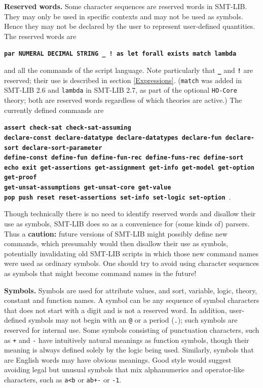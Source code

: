 \documentclass[12pt,oneside]{report}
\begin{document}
{\bf Reserved words.} Some character sequences are reserved words in SMT-LIB.  They may only be used in specific contexts and 
may not be used as symbols.  Hence they may not be declared by the user to represent user-defined quantities. The reserved
words are \\
\centerline{\bf \tt par NUMERAL DECIMAL STRING \_ ! as let forall exists match lambda}
and all the commands of the script language.  Note particularly that {\bf \tt \_} and {\bf \tt !} are
reserved; their use is described in section \ref{Expressions}.  ({\tt match} was added in SMT-LIB 2.6 and {\tt lambda} in SMT-LIB 2.7, as part of the optional {\tt HO-Core} theory; both are reserved words regardless of which theories are active.)
The currently defined commands are
\begin{center}{\bf \tt assert check-sat check-sat-assuming \\
declare-const declare-datatype declare-datatypes declare-fun declare-sort declare-sort-parameter \\
define-const define-fun define-fun-rec define-funs-rec define-sort \\
echo exit get-assertions get-assignment get-info get-model get-option get-proof \\
get-unsat-assumptions get-unsat-core get-value \\
pop push reset reset-assertions set-info set-logic set-option }.\end{center}
  Though technically there is no need to identify
reserved words and disallow their use as symbols, SMT-LIB does so as a convenience for (some kinds of) parsers. Thus a {\bf caution:} future
versions of SMT-LIB might possibly define new commands, which presumably would then disallow their use as symbols, potentially invalidating old
SMT-LIB scripts in which those new command names were used as ordinary symbols.  One should try to avoid using character sequences as symbols that might become command names in the future!

{\bf Symbols.}  Symbols are used for attribute values, and sort, variable, logic, theory, constant and function names. A symbol can be any sequence of symbol characters that does not
start with a digit and is not a reserved word. In addition, user-defined symbols may not begin with an {\tt @} or a period ({\tt .}); such
symbols are reserved for internal use. Some symbols consisting of punctuation characters, such as {\tt +} and {\tt -} have intuitively
natural meanings as function symbols, though their meaning is always defined solely by the logic being used.  Similarly, symbols that are English words 
may have obvious meanings.  Good style would suggest avoiding legal but unusual symbols that mix alphanumerics and operator-like characters, such as {\tt a<b} or {\tt ab+-} or {\tt -1}.
\end{document}
